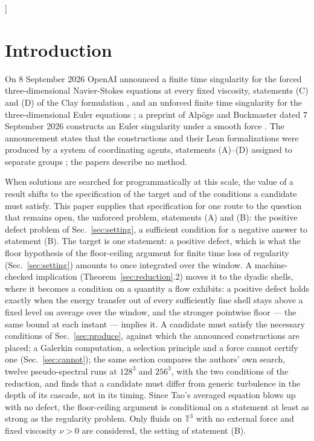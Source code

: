 \documentclass[letterpaper,twocolumn]{article}
\newcommand{\T}{\mathbb{T}}
\begin{document}
\let\clearpage\oldclearpage

]

\section{Introduction}
\label{sec:intro}

On 8 September 2026 OpenAI announced a finite time singularity for the
forced three-dimensional Navier-Stokes equations at every fixed
viscosity, statements (C) and (D) of the Clay formulation \cite{Fef06},
and an unforced finite time singularity for the three-dimensional Euler
equations \cite{OpenAI26NS,OpenAI26Euler}; a preprint of Alp\"oge and
Buckmaster dated 7 September 2026 constructs an Euler singularity under a
smooth force \cite{AlpBuc26}. The announcement states that the
constructions and their Lean formalizations were produced by a system of
coordinating agents, statements (A)--(D) assigned to separate groups
\cite{OpenAI26NS}; the papers describe no method.

When solutions are searched for programmatically at this scale, the
value of a result shifts to the specification of the target and of the
conditions a candidate must satisfy. This paper supplies that
specification for one route to the question that remains open, the
unforced problem, statements (A) and (B): the positive defect problem of
Sec.~\ref{sec:setting}, a sufficient condition for a negative answer to
statement (B). The target is one statement: a positive defect, which is
what the floor hypothesis of the floor-ceiling argument for finite time
loss of regularity (Sec.~\ref{sec:setting}) amounts to once integrated
over the window. A machine-checked implication
(Theorem~\ref{sec:reduction}.2) moves it to the dyadic shells, where it
becomes a condition on a quantity a flow exhibits: a positive defect
holds exactly when the energy transfer out of every sufficiently fine
shell stays above a fixed level on average over the window, and the
stronger pointwise floor --- the same bound at each instant --- implies
it. A candidate must satisfy the necessary conditions of
Sec.~\ref{sec:produce}, against which the announced constructions are
placed; a Galerkin computation, a selection principle and a force cannot
certify one (Sec.~\ref{sec:cannot}); the same section compares the
authors' own search, twelve pseudo-spectral runs at $128^3$ and $256^3$,
with the two conditions of the reduction, and finds that a candidate
must differ from generic turbulence in the depth of its cascade, not in
its timing. Since Tao's averaged equation \cite{Tao16} blows up with no
defect, the floor-ceiling argument is conditional on a statement at
least as strong as the regularity problem. Only fluids on $\T^3$ with no
external force and fixed viscosity $\nu > 0$ are considered, the setting
of statement (B).
\end{document}
